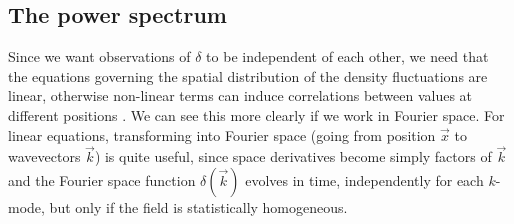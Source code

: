 \subsection{The power spectrum}

Since we want observations of $\delta$ to be independent of each other, we need that the equations governing the spatial 
distribution of the density fluctuations are linear, otherwise non-linear terms can induce correlations between 
values at different positions . We can see this more clearly if we work in Fourier space.
For linear equations, transforming into Fourier space (going from position $\vec x$ to wavevectors $\vec k$) is quite useful, 
since space derivatives become simply  factors of $\vec k$ and the Fourier space function $\delta(\vec k)$
evolves in time, independently for each $k$-mode, but only if the field is statistically homogeneous.

